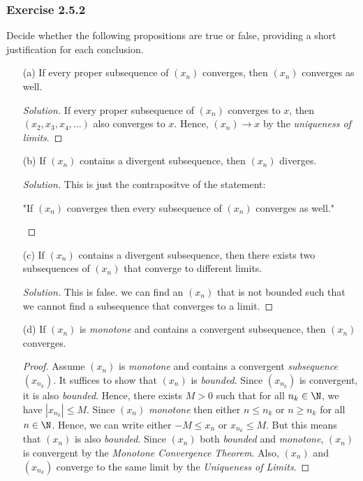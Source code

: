 \subsubsection{Exercise 2.5.2}
Decide whether the following propositions are true or false, providing a short justification for each conclusion.
\begin{enumerate}
    \item[(a)] If every proper subsequence of \( (x_n)\) converges, then \((x_n)\) converges as well.
        \begin{proof}[Solution]
            If every proper subsequence of \((x_n)\) converges to \(x\), then \((x_2, x_3, x_4, ...)\) also converges to \(x\). Hence, \((x_n) \to x\) by the \textit{uniqueness of limits}.
        \end{proof}
    \item[(b)] If \( (x_n)\) contains a divergent subsequence, then \( (x_n)\) diverges.
        \begin{proof}[Solution]
        This is just the contrapositve of the statement: 
        \begin{center}
            "If \( (x_n)\) converges then every subsequence of \( (x_n)\) converges as well."
        \end{center}
        \end{proof}
    \item[(c)] If \( (x_n)\) contains a divergent subsequence, then there exists two subsequences of \( (x_n)\) that converge to different limits. 
        \begin{proof}[Solution]
        This is false. we can find an \((x_n)\) that is not bounded such that we cannot find a subsequence that converges to a limit. 
        \end{proof}
    \item[(d)] If \((x_n)\) is \textit{monotone} and contains a convergent subsequence, then \((x_n)\) converges.
        \begin{proof}
            Assume \( (x_n)\) is \textit{monotone} and contains a convergent \textit{subsequence} \((x_{n_k})\). It suffices to show that \( (x_n)\) is \textit{bounded}. Since \((x_{n_k})\) is convergent, it is also \textit{bounded}. Hence, there exists \(M > 0 \) such that for all \(n_k \in \N \), we have \(|x_{n_k}| \leq M \). Since \((x_n)\) \textit{monotone} then either \(n \leq n_k \) or \( n \geq n_k\) for all \( n \in \N \). Hence, we can write either \(-M \leq x_n \) or \(x_{n_k} \leq M \). But this means that \((x_n)\) is also \textit{bounded}. Since \((x_n)\) both \textit{bounded} and \textit{monotone}, \((x_n)\) is convergent by the \textit{Monotone Convergence Theorem}. Also, \((x_n)\) and \((x_{n_k})\) converge to the same limit by the \textit{Uniqueness of Limits}.
        \end{proof}
\end{enumerate}

